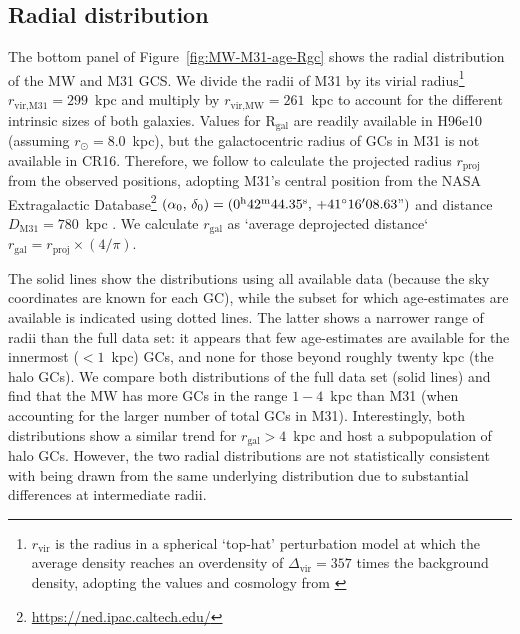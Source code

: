 \documentclass[a4paper,fleqn,usenatbib]{mnras}
\begin{document}
\subsection{Radial distribution}
\label{sec:Rgc}
The bottom panel of Figure~\ref{fig:MW-M31-age-Rgc} shows the radial distribution
of the MW and M31 GCS. We divide the radii of M31 by its virial radius\footnote{
$r_{\text{vir}}$ is the radius in a spherical `top-hat' perturbation model at which
the average density reaches an overdensity of $\Delta_{\text{vir}}=357$ times the 
background density, adopting the values and cosmology from \citet{2017MNRAS.464.3825P}}
$r_{\text{vir,M31}} = 299$~kpc and multiply by $r_{\text{vir,MW}} = 261$~kpc to 
account for the different intrinsic sizes of both galaxies. Values for 
R$_{\text{gal}}$ are readily available in H96e10 (assuming $r_{\odot}=8.0$~kpc), but the galactocentric radius of GCs
in M31 is not available in CR16. Therefore, we follow \citet[][Sec.~4.1]{2019arXiv190111229W} 
to calculate the projected radius $r_{\text{proj}}$ from the observed positions,
adopting M31's central position from the NASA Extragalactic 
Database\footnote{\url{https://ned.ipac.caltech.edu/}} $(\alpha_0, \, \delta_0) =
(0^{\text{h}}42^{\text{m}}44.35^{\text{s}}, \, +41^{\circ}16'08.63")$
and distance $D_{\text{M31}} = 780$~kpc \citep{2005MNRAS.356..979M,2012ApJ...758...11C}.
We calculate $r_{\text{gal}}$ as `average deprojected distance`
$r_{\text{gal}} = r_{\text{proj}} \times (4/\pi)$. 

The solid lines show the distributions using all available data (because the
sky coordinates are known for each GC), while the subset for which age-estimates
are available is indicated using dotted lines. The latter shows a narrower range
of radii than the full data set: it appears that few age-estimates are available 
for the innermost ($<1$~kpc) GCs, and none for those beyond roughly twenty
kpc (the halo GCs). We compare both distributions of the full data set (solid 
lines) and find that the MW has more GCs in the range $1-4$~kpc than M31
(when accounting for the larger number of total GCs in M31). Interestingly, both
distributions show a similar trend for $r_{\text{gal}} > 4$~kpc and host a 
subpopulation of halo GCs. However, the two radial distributions are not statistically
consistent with being drawn from the same underlying distribution due to substantial 
differences at intermediate radii.
\end{document}
